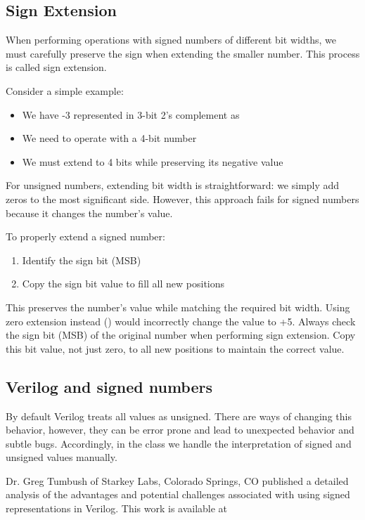 \documentclass[12pt]{labmanual}
\begin{document}
\subsection{Sign Extension}
When performing operations with signed numbers of different bit widths, we must carefully preserve the sign when extending the smaller number. This process is called sign extension.

Consider a simple example:
\begin{itemize}
\item We have -3 represented in 3-bit 2's complement as 
\item We need to operate with a 4-bit number 
\item We must extend  to 4 bits while preserving its negative value
\end{itemize}

For unsigned numbers, extending bit width is straightforward: we simply add zeros to the most significant side. However, this approach fails for signed numbers because it changes the number's value.

To properly extend a signed number:
\begin{enumerate}
    \item Identify the sign bit (MSB)
    \item Copy the sign bit value to fill all new positions
\end{enumerate}

This preserves the number's value while matching the required bit width. Using zero extension instead () would incorrectly change the value to +5. Always check the sign bit (MSB) of the original number when performing sign extension. Copy this bit value, not just zero, to all new positions to maintain the correct value.

\subsection{Verilog and signed numbers}
By default Verilog treats all values as unsigned. There are ways of changing this behavior, however, they can be error prone and lead to unexpected behavior and subtle bugs. Accordingly, in the class we handle the interpretation of signed and unsigned values manually.

\begin{extra}
    Dr. Greg Tumbush of Starkey Labs, Colorado Springs, CO published a detailed analysis of the advantages and potential challenges associated with using signed representations in Verilog. This work is available at 
\end{extra}
\end{document}
